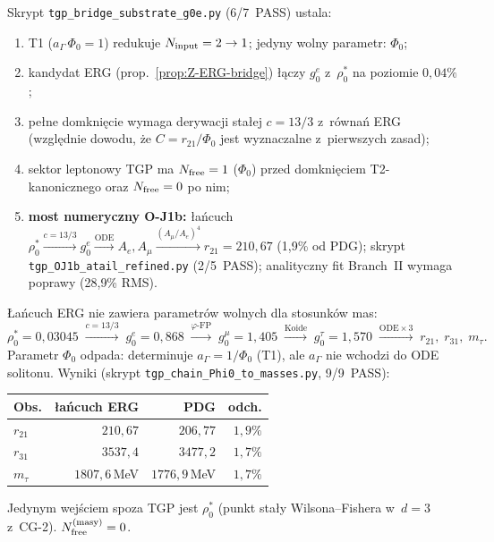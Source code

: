 \begin{remark}
\label{rem:Z-bridge-status}
Skrypt \texttt{tgp\_bridge\_substrate\_g0e.py} (6/7~PASS) ustala:
\begin{enumerate}[nosep]
  \item T1 ($a_\Gamma\,\Phi_0 = 1$) redukuje
    $N_{\rm input} = 2 \to 1$; jedyny wolny parametr: $\Phi_0$;
  \item kandydat ERG (prop.~\ref{prop:Z-ERG-bridge}) \l{}\k{a}czy
    $g_0^e$ z~$\rho_0^*$ na poziomie $0{,}04\%$;
  \item pe\l{}ne domkni\k{e}cie wymaga derywacji sta\l{}ej
    $c = 13/3$ z~r\'owna\'n ERG
    (wzgl\k{e}dnie dowodu, \.ze $C = r_{21}/\Phi_0$
    jest wyznaczalne z~pierwszych zasad);
  \item sektor leptonowy TGP ma $N_{\rm free} = 1$ ($\Phi_0$)
    przed domkni\k{e}ciem T2-kanonicznego
    oraz $N_{\rm free} = 0$ po nim;
  \item \textbf{most numeryczny O-J1b:}
    \l{}a\'ncuch $\rho_0^* \xrightarrow{c=13/3} g_0^e
    \xrightarrow{\text{ODE}} A_e, A_\mu
    \xrightarrow{(A_\mu/A_e)^4} r_{21} = 210{,}67$
    (1{,}9\% od PDG);
    skrypt \texttt{tgp\_OJ1b\_atail\_refined.py} (2/5~PASS);
    analityczny fit Branch~II wymaga poprawy (28{,}9\% RMS).
\end{enumerate}
\end{remark}

\begin{proposition}
\label{prop:Z-zero-param-chain}
\L{}a\'ncuch ERG nie zawiera parametr\'ow wolnych dla stosunk\'ow mas:
\[
  \rho_0^* = 0{,}03045 \;\xrightarrow{c=13/3}\;
  g_0^e = 0{,}868
  \;\xrightarrow{\varphi\text{-FP}}\;
  g_0^\mu = 1{,}405
  \;\xrightarrow{\text{Koide}}\;
  g_0^\tau = 1{,}570
  \;\xrightarrow{\text{ODE}\times 3}\;
  r_{21},\; r_{31},\; m_\tau.
\]
Parametr $\Phi_0$ odpada: determinuje $a_\Gamma = 1/\Phi_0$ (T1),
ale $a_\Gamma$ nie wchodzi do ODE solitonu.
Wyniki (skrypt \texttt{tgp\_chain\_Phi0\_to\_masses.py}, 9/9~PASS):
\begin{center}
\begin{tabular}{lrrr}
\toprule
Obs. & \l{}a\'ncuch ERG & PDG & odch. \\
\midrule
$r_{21}$ & $210{,}67$ & $206{,}77$ & $1{,}9\%$ \\
$r_{31}$ & $3537{,}4$ & $3477{,}2$ & $1{,}7\%$ \\
$m_\tau$ & $1807{,}6$\,MeV & $1776{,}9$\,MeV & $1{,}7\%$ \\
\bottomrule
\end{tabular}
\end{center}
Jedynym wej\'sciem spoza TGP jest $\rho_0^*$ (punkt sta\l{}y Wilsona--Fishera
w~$d=3$ z~CG-2).
$N_{\rm free}^{\rm (masy)} = 0$.
\end{proposition}

